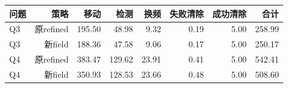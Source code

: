 \begin{tabular}{lrrrrrrr}
\toprule
问题 & 策略 & 移动 & 检测 & 换频 & 失败清除 & 成功清除 & 合计 \\
\midrule
Q3 & 原refined & 195.50 & 48.98 & 9.32 & 0.19 & 5.00 & 258.99 \\
Q3 & 新field & 188.36 & 47.58 & 9.06 & 0.17 & 5.00 & 250.17 \\
Q4 & 原refined & 383.47 & 129.62 & 23.91 & 0.41 & 5.00 & 542.41 \\
Q4 & 新field & 350.93 & 128.53 & 23.66 & 0.48 & 5.00 & 508.60 \\
\bottomrule
\end{tabular}
